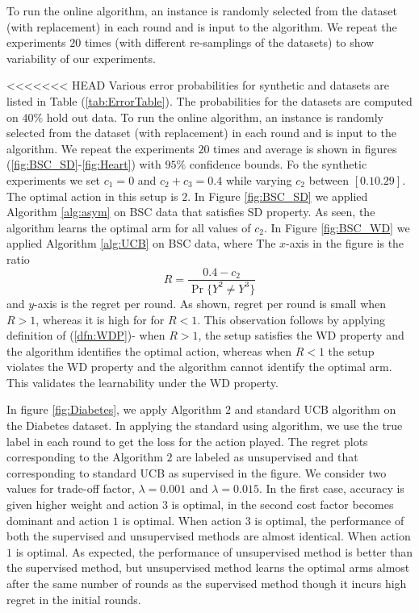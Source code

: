 To run the online algorithm, an instance is randomly selected from the dataset (with replacement) in each round and is input to the  algorithm. We repeat the experiments $20$ times (with different re-samplings of the datasets) to show variability of our experiments.

<<<<<<< HEAD
Various error probabilities for synthetic and datasets are listed in Table (\ref{tab:ErrorTable}).  
The probabilities for the datasets are computed on $40 \%$ hold out data. To run the online algorithm, an instance is randomly selected from the dataset (with replacement) in each round and is input to the  algorithm. We repeat the experiments $20$ times and average is shown in figures (\ref{fig:BSC_SD}-\ref{fig:Heart}) with $95\%$ confidence bounds. 
Fo the synthetic experiments we set $c_1=0$ and $c_2+c_3=0.4$ while varying $c_2$ between $[0.1 0.29]$. The optimal action in this setup is $2$. In Figure \ref{fig:BSC_SD} we applied Algorithm \ref{alg:asym} on BSC data that satisfies SD property. As seen, the algorithm learns the optimal arm for all values of $c_2$. In Figure \ref{fig:BSC_WD} 
we applied Algorithm \ref{alg:UCB} on BSC data, where The $x$-axis in the figure is the ratio
\[R= \frac{0.4 - c_2}{\Pr\{Y^2 \neq Y^3\}}\]
and $y$-axis is the regret per round. As shown,  regret per round is small when $R>1$, whereas it is high for for $R<1$. This observation follows by applying definition of (\ref{dfn:WDP})- when $R>1$, the setup satisfies the WD property and the algorithm identifies the optimal action, whereas when $R<1$ the setup violates the WD property and the algorithm cannot identify the optimal arm. This validates the learnability under the WD property. 

In figure \ref{fig:Diabetes}, we apply Algorithm $2$ and standard UCB algorithm on the Diabetes dataset. In applying the standard using algorithm, we use the true label in each round to get the loss for the action played. The regret plots corresponding to the Algorithm $2$ are labeled as unsupervised and that corresponding to standard UCB as supervised in the figure. We consider two values for trade-off factor, $\lambda=0.001$ and $\lambda=0.015$. In the first case, accuracy is given higher weight and action $3$ is optimal, in the second cost factor becomes dominant and action $1$ is optimal. When action $3$ is optimal, the performance of both the supervised and unsupervised methods are almost identical. When action $1$ is optimal. As expected, the performance of unsupervised method is better than the supervised method, but unsupervised method learns the optimal arms almost after the same number of rounds as the supervised method though it incurs high regret in the initial rounds.
  
